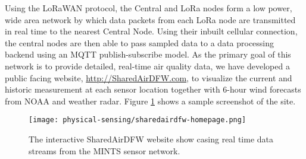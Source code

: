 Using the LoRaWAN protocol, the Central and LoRa nodes form a low power, wide area network by which data packets from each LoRa node are transmitted in real time to the nearest Central Node. Using their inbuilt cellular connection, the central nodes are then able to pass sampled data to a data processing backend using an MQTT publish-subscribe model. As the primary goal of this network is to provide detailed, real-time air quality data, we have developed a public facing website, \url{http://SharedAirDFW.com}, to visualize the current and historic measurement at each sensor location together with 6-hour wind forecasts from NOAA and weather radar. Figure \ref{fig:sharedair-site} shows a sample screenshot of the site.
\begin{figure}[!hbt]
  \centering
  \texttt{[image: physical-sensing/sharedairdfw-homepage.png]}
  \label{fig:sharedair-site}
  \caption{The interactive SharedAirDFW website show casing real time data streams from the MINTS sensor network.}
\end{figure}

